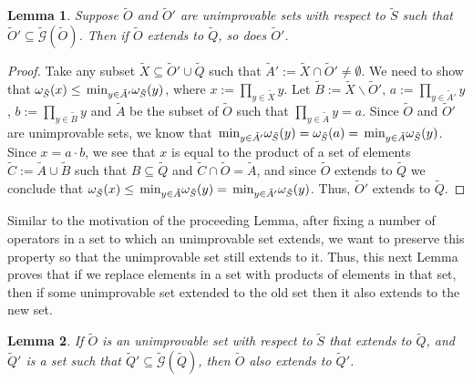\documentclass[twocolumn,showpacs,preprintnumbers,amsmath,amssymb,nofootinbib,pra,floatfix]{revtex4-1}
\newtheorem{lemma}{Lemma}
\newenvironment{remark}[1][Remark]{\begin{trivlist}
\item[\hskip \labelsep {\bfseries #1}]}{\end{trivlist}}
\newcommand{\set}{\tilde}
\newcommand{\genfun}{\tilde{\mathcal{G}}}
\begin{document}
\begin{lemma}
\label{recombining elements preserves extension}
Suppose $\set O$ and $\set O'$ are unimprovable sets with respect to $\set S$ such that $\set O'\subseteq\genfun(\set O)$.  Then if $\set O$ extends to $\set Q$, so does $\set O'$.
\end{lemma}

\begin{proof}
Take any subset $\set X \subseteq \set O'\cup\set Q$ such that $\set A' := \set X\cap \set O' \ne \emptyset$.  We need to show that $\om_{\set S}(x)\le\min_{y\in\set A'}\om_{\set S}(y)$, where $x := \prod_{y\in\set X} y$.  Let $\set B := \set X \backslash \set O'$, $a := \prod_{y\in\set A'} y$, $b := \prod_{y\in\set B} y$ and $\set A$ be the subset of $\set O$ such that $\prod_{y\in\set A} y =a$.  Since $\set O$ and $\set O'$ are unimprovable sets, we know that $\min_{y\in\set A'}\om_{\set S}(y)=\om_{\set S}(a)=\min_{y\in\set A}\om_{\set S}(y)$.  Since $x=a\cdot b$, we see that $x$ is equal to the product of a set of elements $\set C := \set A \cup\set B$ such that $B\subseteq \set Q$ and $\set C\cap\set O=\set A$, and since $\set O$ extends to $\set Q$ we conclude that $\om_{\set S}(x)\le\min_{y\in\set A}\om_{\set S}(y)=\min_{y\in\set A'}\om_{\set S}(y)$.  Thus, $\set O'$ extends to $\set Q$.
\end{proof}
\begin{remark}
Similar to the motivation of the proceeding Lemma, after fixing a number of operators in a set to which an unimprovable set extends, we want to preserve this property so that the unimprovable set still extends to it.  Thus, this next Lemma proves that if we replace elements in a set with products of elements in that set, then if some unimprovable set extended to the old set then it also extends to the new set.
\end{remark}

\begin{lemma}
\label{recombining extension elements preserves extension}
If $\set O$ is an unimprovable set with respect to $\set S$ that extends to $\set Q$, and $\set Q'$ is a set such that $\set Q'\subseteq\genfun(\set Q)$, then $\set O$ also extends to $\set Q'$.
\end{lemma}
\end{document}
